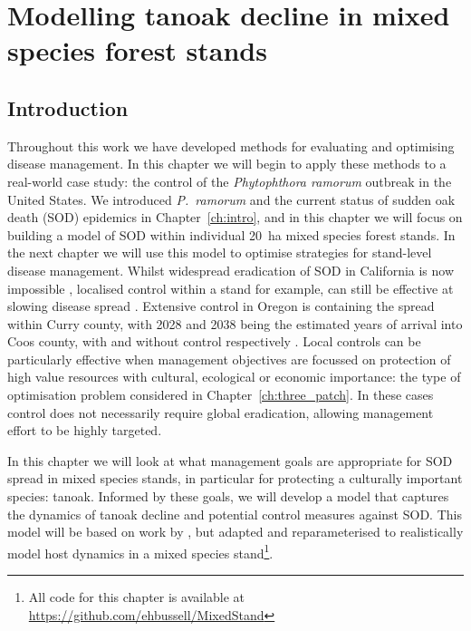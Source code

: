 %
\chapter{Modelling tanoak decline in mixed species forest stands\label{ch:protect_tanoak_model}}

\section{Introduction\label{sec:ch5:Intro}}

Throughout this work we have developed methods for evaluating and optimising disease management. In this chapter we will begin to apply these methods to a real-world case study: the control of the \textit{Phytophthora ramorum} outbreak in the United States. We introduced \textit{P.~ramorum} and the current status of sudden oak death (SOD) epidemics in Chapter~\ref{ch:intro}, and in this chapter we will focus on building a model of SOD within individual \SI{20}{\hectare} mixed species forest stands. In the next chapter we will use this model to optimise strategies for stand-level disease management. Whilst widespread eradication of SOD in California is now impossible \citep{cunniffe_modelling_2016}, localised control within a stand for example, can still be effective at slowing disease spread \citep{hansen_efficacy_2019}. Extensive control in Oregon is containing the spread within Curry county, with 2028 and 2038 being the estimated years of arrival into Coos county, with and without control respectively \citep{sod_economics_assessment}. Local controls can be particularly effective when management objectives are focussed on protection of high value resources with cultural, ecological or economic importance: the type of optimisation problem considered in Chapter~\ref{ch:three_patch}. In these cases control does not necessarily require global eradication, allowing management effort to be highly targeted.

In this chapter we will look at what management goals are appropriate for SOD spread in mixed species stands, in particular for protecting a culturally important species: tanoak. Informed by these goals, we will develop a model that captures the dynamics of tanoak decline and potential control measures against SOD\@. This model will be based on work by \citet{cobb_ecosystem_2012}, but adapted and reparameterised to realistically model host dynamics in a mixed species stand\footnote{All code for this chapter is available at \url{https://github.com/ehbussell/MixedStand}}.


